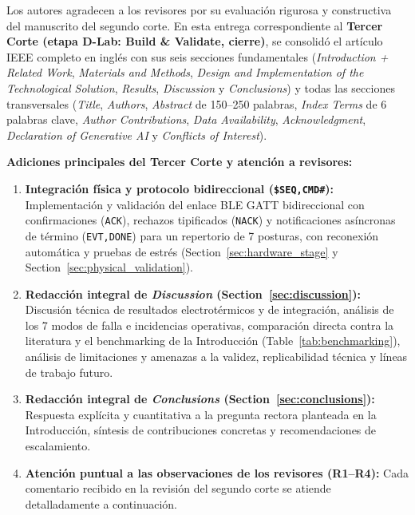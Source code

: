 \documentclass{LabDSTresponse}
\begin{document}


Los autores agradecen a los revisores por su evaluación rigurosa y constructiva del manuscrito del segundo corte. En esta entrega correspondiente al \textbf{Tercer Corte (etapa D-Lab: Build \& Validate, cierre)}, se consolidó el artículo IEEE completo en inglés con sus seis secciones fundamentales (\textit{Introduction + Related Work}, \textit{Materials and Methods}, \textit{Design and Implementation of the Technological Solution}, \textit{Results}, \textit{Discussion} y \textit{Conclusions}) y todas las secciones transversales (\textit{Title}, \textit{Authors}, \textit{Abstract} de 150--250 palabras, \textit{Index Terms} de 6 palabras clave, \textit{Author Contributions}, \textit{Data Availability}, \textit{Acknowledgment}, \textit{Declaration of Generative AI} y \textit{Conflicts of Interest}).

\textbf{Adiciones principales del Tercer Corte y atención a revisores:}
\begin{enumerate}
    \item \textbf{Integración física y protocolo bidireccional (\texttt{\$SEQ,CMD\#}):} Implementación y validación del enlace BLE GATT bidireccional con confirmaciones (\texttt{ACK}), rechazos tipificados (\texttt{NACK}) y notificaciones asíncronas de término (\texttt{EVT,DONE}) para un repertorio de 7 posturas, con reconexión automática y pruebas de estrés (Section~\ref{sec:hardware_stage} y Section~\ref{sec:physical_validation}).
    \item \textbf{Redacción integral de \textit{Discussion} (Section~\ref{sec:discussion}):} Discusión técnica de resultados electrotérmicos y de integración, análisis de los 7 modos de falla e incidencias operativas, comparación directa contra la literatura y el benchmarking de la Introducción (Table~\ref{tab:benchmarking}), análisis de limitaciones y amenazas a la validez, replicabilidad técnica y líneas de trabajo futuro.
    \item \textbf{Redacción integral de \textit{Conclusions} (Section~\ref{sec:conclusions}):} Respuesta explícita y cuantitativa a la pregunta rectora planteada en la Introducción, síntesis de contribuciones concretas y recomendaciones de escalamiento.
    \item \textbf{Atención puntual a las observaciones de los revisores (R1--R4):} Cada comentario recibido en la revisión del segundo corte se atiende detalladamente a continuación.
\end{enumerate}
\end{document}
